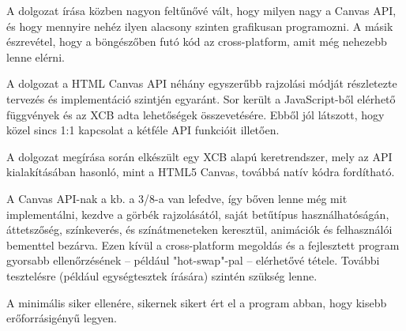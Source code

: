 
A dolgozat írása közben nagyon feltűnővé vált, hogy milyen nagy a Canvas API, és hogy mennyire nehéz ilyen alacsony szinten grafikusan programozni. A másik észrevétel, hogy a böngészőben futó kód az cross-platform, amit még nehezebb lenne elérni.

A dolgozat a HTML Canvas API néhány egyszerűbb rajzolási módját részletezte tervezés és implementáció szintjén egyaránt. Sor került a JavaScript-ből elérhető függvények és az XCB adta lehetőségek összevetésére. Ebből jól látszott, hogy közel sincs 1:1 kapcsolat a kétféle API funkcióit illetően.

A dolgozat megírása során elkészült egy XCB alapú keretrendszer, mely az API kialakításában hasonló, mint a HTML5 Canvas, továbbá natív kódra fordítható.

A Canvas API-nak a kb. a 3/8-a van lefedve, így bőven lenne még mit implementálni, kezdve a görbék rajzolásától, saját betűtípus használhatóságán, áttetszőség, színkeverés, és színátmeneteken keresztül, animációk és felhasználói bementtel bezárva. Ezen kívül a cross-platform megoldás és a fejlesztett program gyorsabb ellenőrzésének -- például "hot-swap"-pal -- elérhetővé tétele. További tesztelésre (például egységtesztek írására) szintén szükség lenne.

A minimális siker ellenére, sikernek sikert ért el a program abban, hogy kisebb erőforrásigényű legyen.

